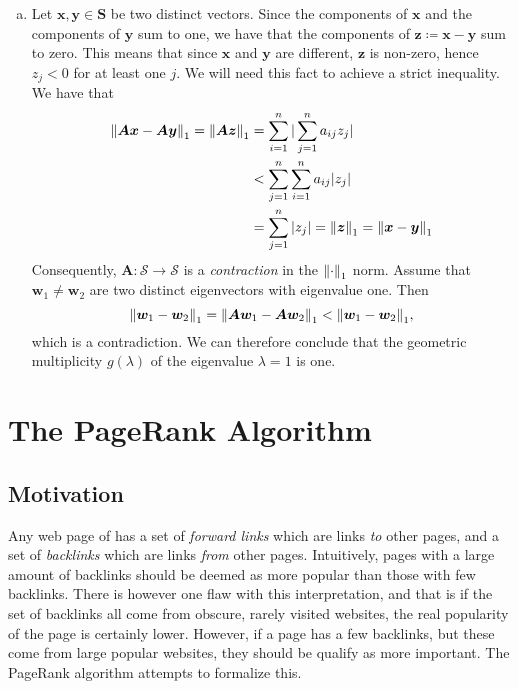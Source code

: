 \documentclass[12pt, oneside, article, a4paper]{memoir}
\newcommand{\mat}[1]{\bm{#1}}
\begin{document}
\begin{enumerate}[a)]
    \item\label{it:contract}Let \( \mat{x}, \mat{y} \in \mat{S} \) be two distinct vectors. Since
        the components of \( \mat{x} \) and the components of \( \mat{y} \) sum
        to one, we have that the components of \( \mat{z} \coloneqq \mat{x} -
        \mat{y} \) sum to zero. This means that since \( \mat{x} \) and \(
        \mat{y} \) are different, \( \mat{z} \) is non-zero, hence \(z_j < 0 \)
        for at least one \( j \). We will need this fact to achieve a strict
        inequality. We have that
        \begin{align}
            \begin{split}
            \norm{\mat{Ax} - \mat{Ay}}_1 = \norm{\mat{Az}}_1 &= \sum_{i = 1}^n |\sum_{j=1}^n a_{ij} z_j| \\
                                                             &< \sum_{j = 1}^n \sum_{i=1}^n a_{ij}|z_j| \\
                                                             &= \sum_{j=1}^n |z_j| = \norm{\mat{z}}_1 = \norm{\mat{x} - \mat{y}}_1
    \end{split}
        \end{align}
        Consequently, \( \mat{A} \colon \mathcal{S} \to \mathcal{S} \) is a
        \emph{contraction} in the \( \norm{\cdot}_1 \) norm.  Assume that \(
        \mat{w}_1 \neq \mat{w}_2 \) are two distinct eigenvectors with
        eigenvalue one. Then
        \begin{equation}
            \norm{\mat{w}_1 - \mat{w}_2}_1 = \norm{\mat{Aw}_1 - \mat{Aw}_2}_1 < \norm{\mat{w}_1 - \mat{w}_2}_1,
        \end{equation}
        which is a contradiction. We can therefore conclude that the geometric
        multiplicity \( g(\lambda) \) of the eigenvalue \( \lambda = 1 \) is
        one.
\end{enumerate}

\chapter{The PageRank Algorithm}

\section{Motivation}

Any web page of has a set of \emph{forward links} which are links \emph{to}
other pages, and a set of \emph{backlinks} which are links \emph{from} other
pages. Intuitively, pages with a large amount of backlinks should be deemed as
more popular than those with few backlinks. There is however one flaw with this
interpretation, and that is if the set of backlinks all come from obscure,
rarely visited websites, the real popularity of the page is certainly lower.
However, if a page has a few backlinks, but these come from large popular
websites, they should be qualify as more important. The PageRank algorithm
attempts to formalize this.
\end{document}
